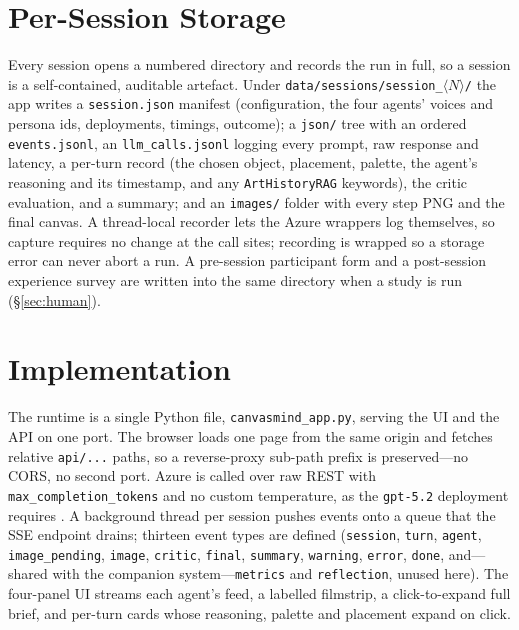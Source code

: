 \documentclass[11pt]{article}
\newcommand{\code}[1]{\texttt{\small #1}}
\newcommand{\file}[1]{\textcolor{accent}{\texttt{\small #1}}}
\newcommand{\RAG}{\code{ArtHistoryRAG}}
\begin{document}
\section{Per-Session Storage}
\label{sec:storage}
Every session opens a numbered directory and records the run in full, so a
session is a self-contained, auditable artefact. Under
\file{data/sessions/session\_$\langle N\rangle$/} the app writes a
\file{session.json} manifest (configuration, the four agents' voices and persona
ids, deployments, timings, outcome); a \file{json/} tree with an ordered
\file{events.jsonl}, an \file{llm\_calls.jsonl} logging every prompt, raw response
and latency, a per-turn record (the chosen object, placement, palette, the agent's
reasoning and its timestamp, and any \RAG{} keywords), the critic evaluation, and a
summary; and an \file{images/} folder with every step PNG and the final canvas. A
thread-local recorder lets the Azure wrappers log themselves, so capture requires
no change at the call sites; recording is wrapped so a storage error can never
abort a run. A pre-session participant form and a post-session experience survey
are written into the same directory when a study is run (\S\ref{sec:human}).

\section{Implementation}
\label{sec:impl}
The runtime is a single Python file, \file{canvasmind\_app.py}, serving the UI and
the API on one port. The browser loads one page from the same origin and fetches
relative \code{api/...} paths, so a reverse-proxy sub-path prefix is preserved---no
CORS, no second port. Azure is called over raw REST with
\code{max\_completion\_tokens} and no custom temperature, as the \code{gpt-5.2}
deployment requires \citep{microsoft2025azure}. A background thread per session
pushes events onto a queue that the SSE endpoint drains; thirteen event types are
defined (\code{session}, \code{turn}, \code{agent}, \code{image\_pending},
\code{image}, \code{critic}, \code{final}, \code{summary}, \code{warning},
\code{error}, \code{done}, and---shared with the companion system---\code{metrics}
and \code{reflection}, unused here). The four-panel UI streams each agent's feed,
a labelled filmstrip, a click-to-expand full brief, and per-turn cards whose
reasoning, palette and placement expand on click.
\end{document}
